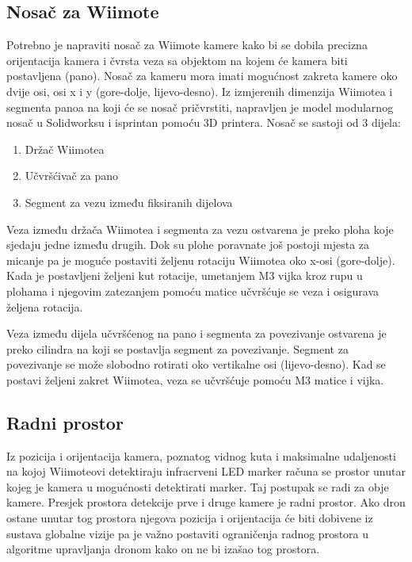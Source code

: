 \documentclass[times, utf8, diplomski]{fer}
\begin{document}
\subsection{Nosač za Wiimote}
Potrebno je napraviti nosač za Wiimote kamere kako bi se dobila precizna orijentacija kamera i čvrsta veza sa objektom na kojem će kamera biti postavljena (pano). Nosač za kameru mora imati mogućnost zakreta kamere oko dvije osi, osi x i y (gore-dolje, lijevo-desno). Iz izmjerenih dimenzija Wiimotea i segmenta panoa na koji će se nosač pričvrstiti, napravljen je model modularnog nosač u Solidworksu i isprintan pomoću 3D printera. Nosač se sastoji od 3 dijela:

\begin{enumerate}
	\item Držač Wiimotea
	\item Učvršćivač za pano
	\item Segment za vezu između fiksiranih dijelova 
\end{enumerate}

Veza između držača Wiimotea i segmenta za vezu ostvarena je preko ploha koje sjedaju jedne između drugih. Dok su plohe poravnate još postoji mjesta za micanje pa je moguće postaviti željenu rotaciju Wiimotea oko x-osi (gore-dolje). Kada je postavljeni željeni kut rotacije, umetanjem M3 vijka kroz rupu u plohama i njegovim zatezanjem pomoću matice učvršćuje se veza i osigurava željena rotacija.

Veza između dijela učvršćenog na pano i segmenta za povezivanje ostvarena je preko cilindra na koji se postavlja segment za povezivanje. Segment za povezivanje se može slobodno rotirati oko vertikalne osi (lijevo-desno). Kad se postavi željeni zakret Wiimotea, veza se učvršćuje pomoću M3 matice i vijka. 

\subsection{Radni prostor}
Iz pozicija i orijentacija kamera, poznatog vidnog kuta i maksimalne udaljenosti na kojoj Wiimoteovi detektiraju infracrveni LED marker računa se prostor unutar kojeg je kamera u mogućnosti detektirati marker. Taj postupak se radi za obje kamere. Presjek prostora detekcije prve i druge kamere je radni prostor. Ako dron ostane unutar tog prostora njegova pozicija i orijentacija će biti dobivene iz sustava globalne vizije pa je važno postaviti ograničenja radnog prostora u algoritme upravljanja dronom kako on ne bi izašao tog prostora.
\end{document}
